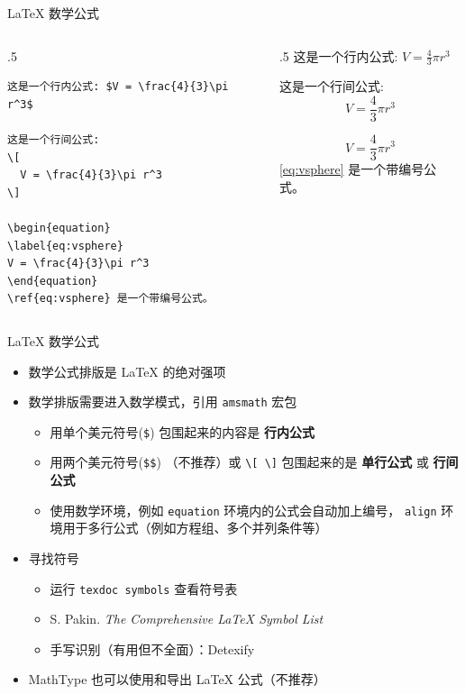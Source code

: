 \begin{frame}[fragile]{\LaTeX{} 数学公式}

\begin{columns}
\begin{column}{.5\textwidth}
\begin{lstlisting}[basicstyle=\ttfamily\small]
这是一个行内公式: $V = \frac{4}{3}\pi r^3$

这是一个行间公式:
\[
  V = \frac{4}{3}\pi r^3
\]

\begin{equation}
\label{eq:vsphere}
V = \frac{4}{3}\pi r^3
\end{equation}
\ref{eq:vsphere} 是一个带编号公式。
\end{lstlisting}
\end{column}

\begin{column}{.5\textwidth}
这是一个行内公式: $V = \frac{4}{3}\pi r^3$

这是一个行间公式:
\[
  V = \frac{4}{3}\pi r^3
\]

\begin{equation}
\label{eq:vsphere}
V = \frac{4}{3}\pi r^3
\end{equation}
\ref{eq:vsphere} 是一个带编号公式。
\end{column}
\end{columns}

\end{frame}

\begin{frame}[fragile]{\LaTeX{} 数学公式}
\begin{itemize}
\item 数学公式排版是 \LaTeX{} 的绝对强项
\item 数学排版需要进入数学模式，引用 \texttt{amsmath} 宏包
	\begin{itemize}
	\item 用单个美元符号(\verb|$|) 包围起来的内容是 {\bf 行内公式}
  \item 用两个美元符号(\verb|$$|) （不推荐）或 \verb|\[ \]| 包围起来的是 {\bf 单行公式} 或 {\bf 行间公式}
	\item 使用数学环境，例如 \texttt{equation} 环境内的公式会自动加上编号，
		\texttt{align} 环境用于多行公式（例如方程组、多个并列条件等）
  \end{itemize}
\item 寻找符号
    \begin{itemize}
      \item 运行 \texttt{texdoc symbols} 查看符号表
      \item S. Pakin. \emph{The Comprehensive \LaTeX{} Symbol List}
      \item 手写识别（有用但不全面）：Detexify 
    \end{itemize}
\item MathType 也可以使用和导出 \LaTeX{} 公式（不推荐）
\end{itemize}
\end{frame}

